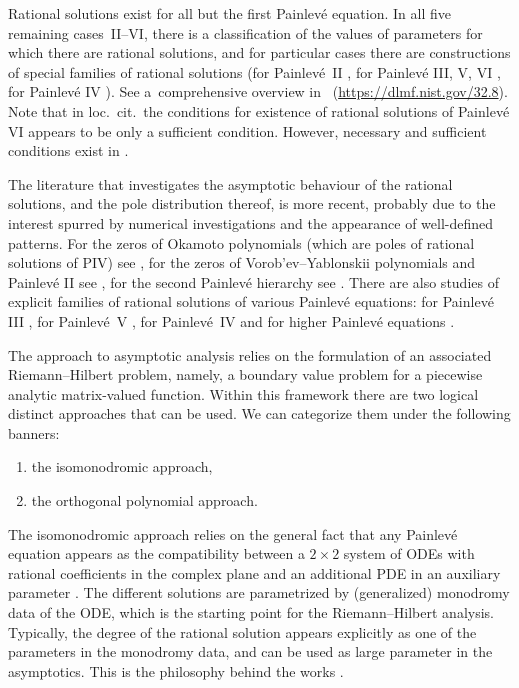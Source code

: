 \documentclass[10pt,a4paper]{amsart}
\numberwithin{equation}{section}
\theoremstyle{definition}
\begin{document}
Rational solutions exist for all but the first Painlev\'e equation. In all five remaining cases~II--VI, there is a classification of the values of parameters for which there are rational solutions, and for particular cases there are constructions of special families of rational solutions (for Painlev\'e~II \cite{KajiwaraOhta,Vorobev, Yablonskii}, for Painlev\'e III, V, VI \cite{Masuda,MR1942391, MR1650509, Okamoto2,Okamoto3, Umemura1}, for Painlev\'e IV \cite{Okamoto1}). See a~comprehensive overview in~\cite{DLMF} (\href{https://dlmf.nist.gov/32.8}{https://dlmf.nist.gov/32.8}). Note that in loc.\ cit.\ the conditions for existence of rational solutions of Painlev\'e VI appears to be only a sufficient condition. However, necessary and sufficient conditions exist in \cite{Marta}.

The literature that investigates the asymptotic behaviour of the rational solutions, and the pole distribution thereof, is more recent, probably due to the interest spurred by numerical investigations and the appearance of well-defined patterns. For the zeros of Okamoto polynomials (which are poles of rational solutions of PIV) see \cite{Ref1_3, BuckMill22, Clakxon_IV,Novok14}, for the zeros of Vorob'ev--Yablonskii polynomials and Painlev\'e II see \cite{BertolaBothner, BuckMill14, BuckMill15,Clarxon,Ref1_4}, for the second Painlev\'e hierarchy see \cite{BalBerBo,Clarxon}. There are also studies of explicit families of rational solutions of various Painlev\'e equations: for Painlev\'e III \cite{Ref1_2,Ref1_1, ClaxonIII}, for Painlev\'e~V \cite{Ar1, Ar2,ClarksonV, ClarksonDunning}, for Painlev\'e~IV \cite{Ref1_3, Clakxon_IV, MasoeroIV, MasoeroIV2} and for higher Painlev\'e equations \cite{Ar3,BalBerBo}.

The approach to asymptotic analysis relies on the formulation of an associated Riemann--Hilbert problem, namely, a boundary value problem for a piecewise analytic matrix-valued function.
Within this framework there are two logical distinct approaches that can be used. We can categorize them under the following banners:
\begin{enumerate}\itemsep=0pt\samepage
\item[$(1)$] the isomonodromic approach,
\item[$(2)$] the orthogonal polynomial approach.
\end{enumerate}

\pagebreak

\noindent
The isomonodromic approach relies on the general fact that any Painlev\'e equation appears as the compatibility between a $2\times 2$ system of ODEs with rational coefficients in the complex plane and an additional PDE in an auxiliary parameter \cite{JMU1}. The different solutions are parametrized by (generalized) monodromy data of the ODE, which is the starting point for the Riemann--Hilbert analysis. Typically, the degree of the rational solution appears explicitly as one of the parameters in the monodromy data, and can be used as large parameter in the asymptotics. This is the philosophy behind the works \cite{BuckMill14, BuckMill15}.
\end{document}
